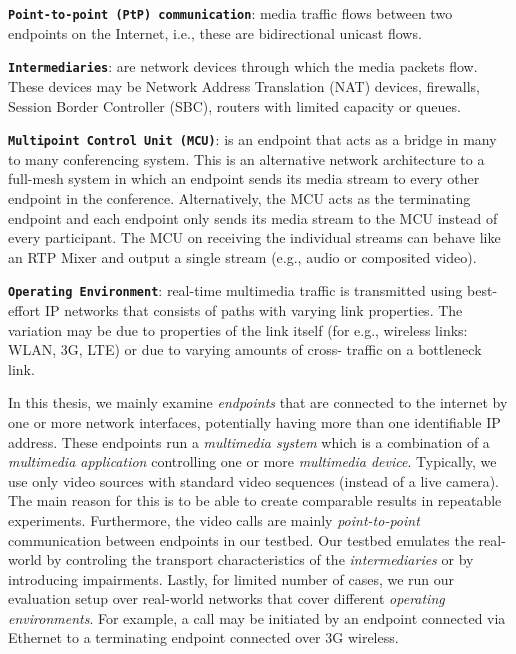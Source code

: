 
\textbf{\texttt{Point-to-point (PtP) communication}}: media traffic flows
between two endpoints on the Internet, i.e., these are bidirectional unicast
flows.

\textbf{\texttt{Intermediaries}}: are network devices through which the media
packets flow. These devices may be Network Address Translation (NAT) devices,
firewalls, Session Border Controller (SBC), routers with limited capacity or
queues.

\textbf{\texttt{Multipoint Control Unit (MCU)}}: is an endpoint that acts as a
bridge in many to many conferencing system. This is an alternative network
architecture to a full-mesh system in which an endpoint sends its media stream
to every other endpoint in the conference. Alternatively, the MCU acts as the
terminating endpoint and each endpoint only sends its media stream  to the MCU
instead of every participant. The MCU on receiving the individual streams can
behave like an RTP Mixer and output a single stream (e.g., audio or composited
video).

\textbf{\texttt{Operating Environment}}: real-time multimedia traffic is
transmitted using best-effort IP networks that consists of paths with varying
link properties. The variation may be due to properties of the link itself
(for e.g., wireless links: WLAN, 3G, LTE) or due to varying amounts of cross-
traffic on a bottleneck link.


In this thesis, we mainly examine \emph{endpoints} that are connected to the
internet by one or more network interfaces, potentially having more than one
identifiable IP address. These endpoints run a \emph{multimedia system} which
is a combination of a \emph{multimedia application} controlling one or  more
\emph{multimedia device}. Typically, we use only video sources with standard
video sequences (instead of a live camera). The main reason for this is to be
able to create comparable results in repeatable experiments. Furthermore,  the
video calls are mainly \emph{point-to-point} communication between  endpoints
in our testbed. Our testbed emulates the real-world by controling the
transport characteristics of the \emph{intermediaries} or by introducing
impairments. Lastly, for limited number of cases, we run our evaluation setup
over real-world networks that cover different \emph{operating environments}.
For example, a call may be initiated by an endpoint connected via Ethernet to
a terminating endpoint connected over 3G wireless.

